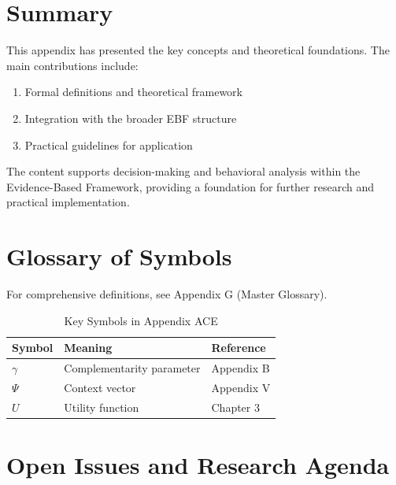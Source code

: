 \section{Summary}
\label{sec:ace-summary}

This appendix has presented the key concepts and theoretical foundations.
The main contributions include:

\begin{enumerate}
    \item Formal definitions and theoretical framework
    \item Integration with the broader EBF structure
    \item Practical guidelines for application
\end{enumerate}

The content supports decision-making and behavioral analysis within the
Evidence-Based Framework, providing a foundation for further research
and practical implementation.



\section{Glossary of Symbols}
\label{sec:ace-glossary}

For comprehensive definitions, see Appendix G (Master Glossary).

\begin{table}[htbp]
\centering
\caption{Key Symbols in Appendix ACE}
\begin{tabular}{lll}
\toprule
\textbf{Symbol} & \textbf{Meaning} & \textbf{Reference} \\
\midrule
$\gamma$ & Complementarity parameter & Appendix B \\
$\Psi$ & Context vector & Appendix V \\
$U$ & Utility function & Chapter 3 \\
\bottomrule
\end{tabular}
\end{table}



\section{Open Issues and Research Agenda}
\label{sec:ace-open-issues}


